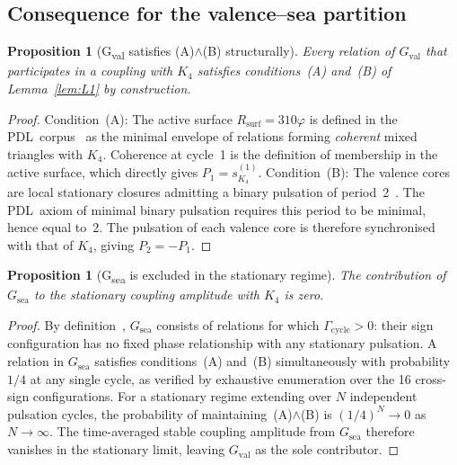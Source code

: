 \documentclass[11pt,a4paper]{article}
\newtheorem{proposition}[theorem]{Proposition}
\theoremstyle{definition}
\newcommand{\PDL}{\textnormal{PDL}}
\newcommand{\Rsurf}{R_{\mathrm{surf}}}
\newcommand{\Kfour}{K_4}
\newcommand{\vp}{\varphi}
\newcommand{\Gval}{G_{\mathrm{val}}}
\newcommand{\Gsea}{G_{\mathrm{sea}}}
\begin{document}
\subsection{Consequence for the valence--sea partition}

\begin{proposition}[G\textsubscript{val} satisfies (A)$\wedge$(B) structurally]
\label{prop:gval}
Every relation of $\Gval$ that participates in a coupling with $\Kfour$ satisfies conditions~\textup{(A)} and~\textup{(B)} of Lemma~\ref{lem:L1} by construction.
\end{proposition}

\begin{proof}
Condition~(A): The active surface $\Rsurf = 310\vp$ is defined in the \PDL\ corpus~\cite{PDL_Main_2026,Golden_Ratio_PDL_2026} as the minimal envelope of relations forming \emph{coherent} mixed triangles with $\Kfour$. Coherence at cycle~1 is the definition of membership in the active surface, which directly gives $P_1 = s_{\Kfour}^{(1)}$. Condition~(B): The valence cores are local stationary closures admitting a binary pulsation of period~2~\cite{PDL_Main_2026}. The \PDL\ axiom of minimal binary pulsation requires this period to be minimal, hence equal to~2. The pulsation of each valence core is therefore synchronised with that of $\Kfour$, giving $P_2 = -P_1$.
\end{proof}

\begin{proposition}[G\textsubscript{sea} is excluded in the stationary regime]
\label{prop:gsea}
The contribution of $\Gsea$ to the stationary coupling amplitude with $\Kfour$ is zero.
\end{proposition}

\begin{proof}
By definition~\cite{Leakage_18_PDL_2026}, $\Gsea$ consists of relations for which $\Gamma_{\mathrm{cycle}} > 0$: their sign configuration has no fixed phase relationship with any stationary pulsation. A relation in $\Gsea$ satisfies conditions~(A) and~(B) simultaneously with probability $1/4$ at any single cycle, as verified by exhaustive enumeration over the 16 cross-sign configurations. For a stationary regime extending over $N$ independent pulsation cycles, the probability of maintaining~(A)$\wedge$(B) is $(1/4)^N \to 0$ as $N \to \infty$. The time-averaged stable coupling amplitude from $\Gsea$ therefore vanishes in the stationary limit, leaving $\Gval$ as the sole contributor.
\end{proof}
\end{document}
